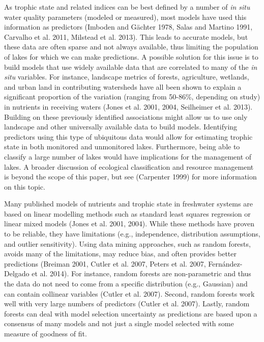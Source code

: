 \documentclass[12pt,]{article}
\begin{document}
As trophic state and related indices can be best defined by a number of
\emph{in situ} water quality parameters (modeled or measured), most
models have used this information as predictors (Imboden and G{ä}chter
1978, Salas and Martino 1991, Carvalho et al. 2011, Milstead et al.
2013). This leads to accurate models, but these data are often sparse
and not always available, thus limiting the population of lakes for
which we can make predictions. A possible solution for this issue is to
build models that use widely available data that are correlated to many
of the \emph{in situ} variables. For instance, landscape metrics of
forests, agriculture, wetlands, and urban land in contributing
watersheds have all been shown to explain a significant proportion of
the variation (ranging from 50-86\%, depending on study) in nutrients in
receiving waters (Jones et al. 2001, 2004, Seilheimer et al. 2013).
Building on these previously identified associations might allow us to
use only landscape and other universally available data to build models.
Identifying predictors using this type of ubiquitous data would allow
for estimating trophic state in both monitored and unmonitored lakes.
Furthermore, being able to classify a large number of lakes would have
implications for the management of lakes. A broader discussion of
ecological classification and resource management is beyond the scope of
this paper, but see (Carpenter 1999) for more information on this topic.

Many published models of nutrients and trophic state in freshwater
systems are based on linear modelling methods such as standard least
squares regression or linear mixed models (Jones et al. 2001, 2004).
While these methods have proven to be reliable, they have limitations
(e.g., independence, distribution assumptions, and outlier sensitivity).
Using data mining approaches, such as random forests, avoids many of the
limitations, may reduce bias, and often provides better predictions
(Breiman 2001, Cutler et al. 2007, Peters et al. 2007, Fernández-Delgado
et al. 2014). For instance, random forests are non-parametric and thus
the data do not need to come from a specific distribution (e.g.,
Gaussian) and can contain collinear variables (Cutler et al. 2007).
Second, random forests work well with very large numbers of predictors
(Cutler et al. 2007). Lastly, random forests can deal with model
selection uncertainty as predictions are based upon a consensus of many
models and not just a single model selected with some measure of
goodness of fit.
\end{document}
